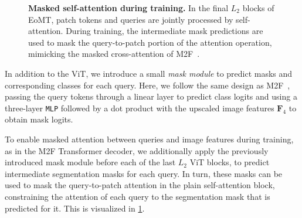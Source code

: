 \documentclass[10pt,twocolumn,letterpaper]{article}
\begin{document}
\begin{figure}[t]
\clearpage{}
\vspace{-24pt}
    \caption{\textbf{Masked self-attention during training.} In the final $L_2$ blocks of EoMT, patch tokens and queries are jointly processed by self-attention. During training, the intermediate mask predictions are used to mask the query-to-patch portion of the attention operation, mimicking the masked cross-attention of M2F~\cite{cheng2022mask2former}.}
    \label{fig:masked_self_attention}
\end{figure}


In addition to the ViT, we introduce a small \textit{mask module} to predict masks and corresponding classes for each query.
Here, we follow the same design as M2F~\cite{cheng2022mask2former}, passing the query tokens through a linear layer to predict class logits and using a three-layer \texttt{MLP} followed by a dot product with the upscaled image features $\bm{F}_4$ to obtain mask logits. 





To enable masked attention between queries and image features during training, as in the M2F Transformer decoder, we additionally apply the previously introduced mask module before each of the last $L_2$ ViT blocks, to predict intermediate segmentation masks for each query.
In turn, these masks can be used to mask the query-to-patch attention in the plain self-attention block, constraining the attention of each query to the segmentation mask that is predicted for it. 
This is visualized in \cref{fig:masked_self_attention}.
\end{document}
